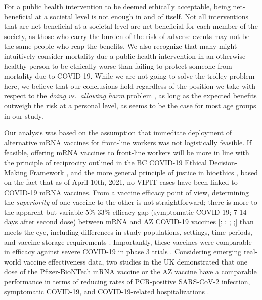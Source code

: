 \documentclass[]{interact}
\theoremstyle{plain}%
\theoremstyle{definition}
\theoremstyle{remark}
\begin{document}
For a public health intervention to be deemed ethically acceptable,
being net-beneficial at a societal level is not enough in and of itself.
Not all interventions that are net-beneficial at a societal level are
net-beneficial for each member of the society, as those who carry the
burden of the risk of adverse events may not be the same people who reap
the benefits. We also recognize that many might intuitively consider
mortality due a public health intervention in an otherwise healthy
person to be ethically worse than failing to protect someone from
mortality due to COVID-19. While we are not going to solve the trolley
problem here, we believe that our conclusions hold regardless of the
position we take with respect to the \emph{doing vs.~allowing harm}
problem \citep{woollard_doing_2016}, as long as the expected benefits
outweigh the risk at a personal level, as seems to be the case for most
age groups in our study.

Our analysis was based on the assumption that immediate deployment of
alternative mRNA vaccines for front-line workers was not logistically
feasible. If feasible, offering mRNA vaccines to front-line workers will
be more in line with the principle of reciprocity outlined in the BC
COVID-19 Ethical Decision-Making Framework \citep{bccdc_covid-19_2020},
and the more general principle of justice in bioethics
\citep{mccormick_principles_2021}, based on the fact that as of April
10th, 2021, no VIPIT cases have been linked to COVID-19 mRNA vaccines.
From a vaccine efficacy point of view, determining the
\emph{superiority} of one vaccine to the other is not straightforward;
there is more to the apparent but variable 5\%-33\% efficacy gap
(symptomatic COVID-19; 7-14 days after second dose) between mRNA and AZ
COVID-19 vaccines {[}\citet{polack_safety_2020};
\citet{baden_efficacy_2021}; \citet{astrazeneca_azd1222_2021};
\citet{emary_efficacy_2021};{]} than meets the eye, including
differences in study populations, settings, time periods, and vaccine
storage requirements \citep{ledford_why_2021}. Importantly, these
vaccines were comparable in efficacy against severe COVID-19 in phase 3
trials \citep{abdool_karim_new_2021, astrazeneca_azd1222_2021}.
Considering emerging real-world vaccine effectiveness data, two studies
in the UK demonstrated that one dose of the Pfizer-BioNTech mRNA vaccine
or the AZ vaccine have a comparable performance in terms of reducing
rates of PCR-positive SARS-CoV-2 infection, symptomatic COVID-19, and
COVID-19-related hospitalizations
\citep{shrotri_vaccine_2021, jamie_lopez_bernal_early_2021}.
\end{document}
